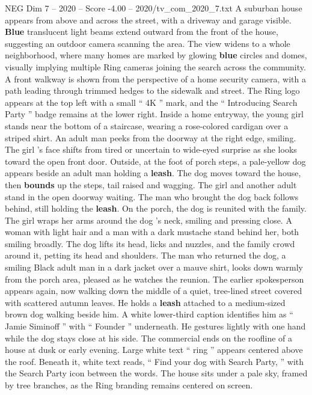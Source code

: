 \begin{textsample}{NEG Dim 7 – 2020 – Score -4.00 – 2020/tv\_com\_2020\_7.txt}
A suburban house appears from above and across the street, with a driveway and garage visible. \textbf{Blue} translucent light beams extend outward from the front of the house, suggesting an outdoor camera scanning the area.
The view widens to a whole neighborhood, where many homes are marked by glowing \textbf{blue} circles and domes, visually implying multiple Ring cameras joining the search across the community.
A front walkway is shown from the perspective of a home security camera, with a path leading through trimmed hedges to the sidewalk and street.
The Ring logo appears at the top left with a small “ 4K ” mark, and the “ Introducing Search Party ” badge remains at the lower right.
Inside a home entryway, the young girl stands near the bottom of a staircase, wearing a rose-colored cardigan over a striped shirt.
An adult man peeks from the doorway at the right edge, smiling.
The girl ’s face shifts from tired or uncertain to wide-eyed surprise as she looks toward the open front door.
Outside, at the foot of porch steps, a pale-yellow dog appears beside an adult man holding a \textbf{leash}.
The dog moves toward the house, then \textbf{bounds} up the steps, tail raised and wagging.
The girl and another adult stand in the open doorway waiting.
The man who brought the dog back follows behind, still holding the \textbf{leash}.
On the porch, the dog is reunited with the family.
The girl wraps her arms around the dog ’s neck, smiling and pressing close.
A woman with light hair and a man with a dark mustache stand behind her, both smiling broadly.
The dog lifts its head, licks and nuzzles, and the family crowd around it, petting its head and shoulders.
The man who returned the dog, a smiling Black adult man in a dark jacket over a mauve shirt, looks down warmly from the porch area, pleased as he watches the reunion.
The earlier spokesperson appears again, now walking down the middle of a quiet, tree-lined street covered with scattered autumn leaves.
He holds a \textbf{leash} attached to a medium-sized brown dog walking beside him.
A white lower-third caption identifies him as “ Jamie Siminoff ” with “ Founder ” underneath.
He gestures lightly with one hand while the dog stays close at his side.
The commercial ends on the roofline of a house at dusk or early evening.
Large white text “ ring ” appears centered above the roof.
Beneath it, white text reads, “ Find your dog with Search Party, ” with the Search Party icon between the words.
The house sits under a pale sky, framed by tree branches, as the Ring branding remains centered on screen.

\end{textsample}
